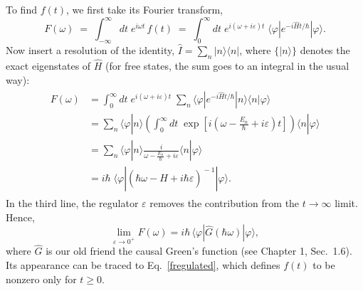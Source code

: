 \documentclass[pra,12pt]{revtex4-2}
\begin{document}
To find $f(t)$, we first take its Fourier transform,
\begin{equation}
  F(\omega) \;=\; \int_{-\infty}^\infty dt \; e^{i\omega t}\, f(t) \;=\; \int_0^\infty dt \; e^{i(\omega + i\varepsilon) t} \; \langle\varphi|e^{-i\hat{H}t/\hbar}|\varphi\rangle.
\end{equation}
Now insert a resolution of the identity, $\hat{I} = \sum_n
|n\rangle\langle n|$, where $\{|n\rangle\}$ denotes the exact
eigenstates of $\hat{H}$ (for free states, the sum goes to an integral
in the usual way):
\begin{align}
  \begin{aligned}F(\omega) &= \int_0^\infty dt \; e^{i(\omega + i\varepsilon) t} \; \sum_n \langle\varphi|e^{-i\hat{H}t/\hbar}|n\rangle\langle n|\varphi\rangle \\ &= \sum_n \langle\varphi|n\rangle \left( \int_0^\infty dt \; \exp\left[i\left(\omega - \frac{E_n}{\hbar} + i\varepsilon\right) t\right] \right) \langle n|\varphi\rangle \\ &= \sum_n \langle\varphi|n\rangle \frac{i}{\omega - \frac{E_n}{\hbar} + i \varepsilon} \langle n|\varphi\rangle \\ &= i \hbar\; \langle \varphi | \left(\hbar\omega - \hat{H} + i\hbar\varepsilon \right)^{\!-1} | \varphi\rangle. \end{aligned}
\end{align}
In the third line, the regulator $\varepsilon$ removes the
contribution from the $t \rightarrow\infty$ limit.  Hence,
\begin{equation}
  \lim_{\varepsilon \rightarrow 0^+} F(\omega) = i \hbar \, \langle \varphi | \hat{G}(\hbar\omega) | \varphi\rangle,
\end{equation}
where $\hat{G}$ is our old friend the causal Green's function (see
Chapter 1, Sec.~1.6).  Its appearance can be traced to
Eq.~\eqref{fregulated}, which defines $f(t)$ to be nonzero only for $t
\ge 0$.
\end{document}

